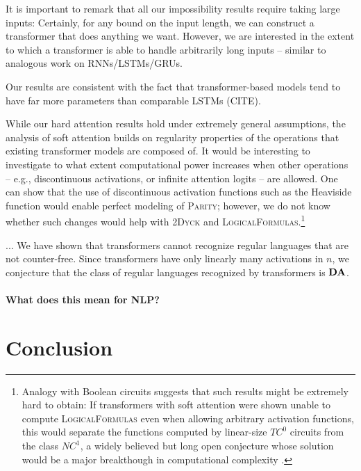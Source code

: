 \documentclass[11pt,a4paper]{article}
\begin{document}
It is important to remark that all our impossibility results require taking large inputs:
Certainly, for any bound on the input length, we can construct a transformer that does anything we want.
However, we are interested in the extent to which a transformer is able to handle arbitrarily long inputs -- similar to analogous work on RNNs/LSTMs/GRUs.

Our results are consistent with the fact that transformer-based models tend to have far more parameters than comparable LSTMs (CITE).

While our hard attention results hold under extremely general assumptions, the analysis of soft attention builds on regularity properties of the operations that existing transformer models are composed of.
It would be interesting to investigate to what extent computational power increases when other operations -- e.g., discontinuous activations, or infinite attention logits -- are allowed.
One can show that the use of discontinuous activation functions such as the Heaviside function would enable perfect modeling of \textsc{Parity}; however, we do not know whether such changes would help with \textsc{2Dyck} and \textsc{LogicalFormulas}.\footnote{Analogy with Boolean circuits suggests that such results might be extremely hard to obtain: If transformers with soft attention were shown unable to compute \textsc{LogicalFormulas} even when allowing arbitrary activation functions, this would separate the functions computed by linear-size $TC^0$ circuits from the class $NC^1$, a widely believed but long open conjecture whose solution would be a major breakthough in computational complexity \cite{arora2009computational}.} %

...
We have shown that transformers cannot recognize regular languages that are not counter-free.
Since transformers have only linearly many activations in $n$, we conjecture that the class of regular languages recognized by transformers is $\bf{DA}$.


\paragraph{What does this mean for NLP?}


\section{Conclusion}



\end{document}
